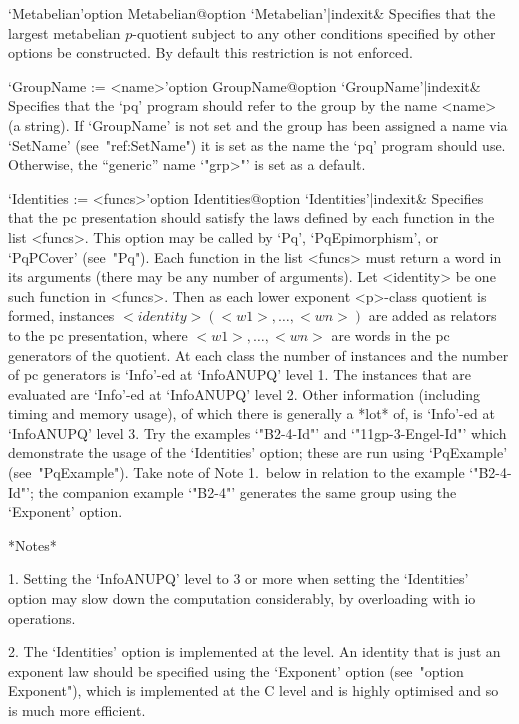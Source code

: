 \>`Metabelian'{option Metabelian}@{option `Metabelian'|indexit}&
Specifies that the largest metabelian $p$-quotient subject to  any  other
conditions specified by other options be  constructed.  By  default  this
restriction is not enforced.

\>`GroupName := <name>'{option GroupName}@{option `GroupName'|indexit}&
Specifies that the `pq' program should refer to  the  group  by  the  name
<name> (a string). If `GroupName' is not  set  and  the  group  has  been
assigned a name via `SetName' (see~"ref:SetName") it is set as  the  name
the `pq' program should use. Otherwise, the ``generic'' name `"\<grp>"' is
set as a default.

\>`Identities := <funcs>'{option Identities}@{option `Identities'|indexit}&
Specifies that the pc presentation should satisfy  the  laws  defined  by
each function in the list <funcs>. This option may  be  called  by  `Pq',
`PqEpimorphism', or `PqPCover' (see~"Pq").  Each  function  in  the  list
<funcs> must return a word in its arguments (there may be any  number  of
arguments). Let <identity> be one such function in <funcs>. Then as  each
lower exponent <p>-class quotient is formed, instances  $<identity>(<w1>,
\dots, <wn>)$ are added as relators to the pc presentation, where  $<w1>,
\dots, <wn>$ are words in the pc generators  of  the  quotient.  At  each
class the number  of  instances  and  the  number  of  pc  generators  is
`Info'-ed at `InfoANUPQ' level 1. The instances that  are  evaluated  are
`Info'-ed at `InfoANUPQ' level 2. Other information (including timing and
memory usage), of which there is generally a *lot* of,  is  `Info'-ed  at
`InfoANUPQ' level 3. Try the examples `"B2-4-Id"' and `"11gp-3-Engel-Id"' 
which demonstrate the usage of the `Identities'  option;  these  are  run
using `PqExample'  (see~"PqExample").  Take  note  of  Note  1.~below  in
relation to the  example  `"B2-4-Id"';  the  companion  example  `"B2-4"'
generates the same group using the `Exponent' option.

*Notes*

\beginlist%

\item{1.}
Setting the `InfoANUPQ' level to 3 or more when setting the  `Identities'
option may slow down the computation considerably, by overloading  {\GAP}
with io operations.

\item{2.}
The `Identities' option is implemented at the {\GAP} level.  An  identity
that is just an exponent law should be  specified  using  the  `Exponent'
option (see~"option Exponent"), which is implemented at the C  level  and
is highly optimised and so is much more efficient.

